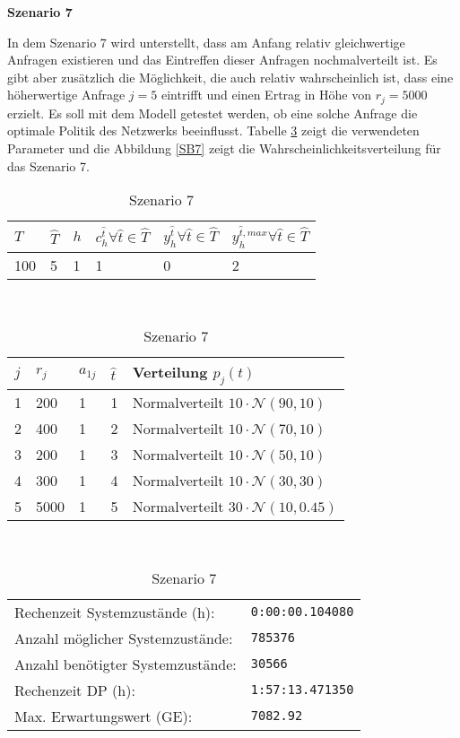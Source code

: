 \textbf{Szenario 7}

In dem Szenario 7 wird unterstellt, dass am Anfang relativ gleichwertige Anfragen existieren und das Eintreffen dieser Anfragen nochmalverteilt ist. Es gibt aber zusätzlich die Möglichkeit, die auch relativ wahrscheinlich ist, dass eine höherwertige Anfrage $j=5$ eintrifft und einen Ertrag in Höhe von $r_j=5000$ erzielt. Es soll mit dem Modell getestet werden, ob eine solche Anfrage die optimale Politik des Netzwerks beeinflusst. Tabelle \ref{S7} zeigt die verwendeten Parameter und die Abbildung \ref{SB7} zeigt die Wahrscheinlichkeitsverteilung für das Szenario 7.


\begin{table}[h!]
\renewcommand{\arraystretch}{1.5}
  \begin{center}
    \caption{Szenario 7}  \label{S7}
    \vspace*{3mm}
    \begin{tabular}{l l l l l l}   %
    $T$ & $\hat T$  & $h$ & $c_h^{\hat t}\forall \hat{t}\in{\hat T}$ & $y_h^{\hat t}\forall \hat{t}\in{\hat T}$  & $y_h^{{\hat t},max}\forall \hat{t}\in{\hat T}$  \\  \hline
100 & 5 & 1 & 1 & 0 & 2  \\ \hline
    \end{tabular} \\[3mm]
        \begin{tabular}{p{1cm} p{1cm} p{1cm}  p{1cm} p{6cm}}   %
    $j$ & $r_j$  & $a_{1j}$ & $\hat t$ & Verteilung $p_j(t)$ \\  \hline
1 & 200 & 1 & 1 & Normalverteilt $10\cdot\mathcal{N}(90, 10)$   \\
2 & 400 & 1 & 2 & Normalverteilt $10\cdot\mathcal{N}(70, 10)$  \\
3 & 200 & 1 & 3 & Normalverteilt $10\cdot\mathcal{N}(50, 10)$  \\
4 & 300 & 1 & 4 & Normalverteilt $10\cdot\mathcal{N}(30, 30)$  \\
5 & 5000 & 1 & 5 & Normalverteilt $30\cdot\mathcal{N}(10, 0.45)$ \\
\hline
    \end{tabular} \\[3mm]
     \begin{tabular}{p{7cm}p{5cm}} \hline
     Rechenzeit Systemzustände (h): & \texttt{0:00:00.104080} \\
     Anzahl möglicher Systemzustände: & \texttt{785376} \\
     Anzahl benötigter Systemzustände: & \texttt{30566} \\ 
     Rechenzeit DP (h): & \texttt{1:57:13.471350} \\ 
          Max. Erwartungswert (GE): & \texttt{7082.92} \\ \hline
         \end{tabular} \\[3mm]
  \end{center}
\end{table}

